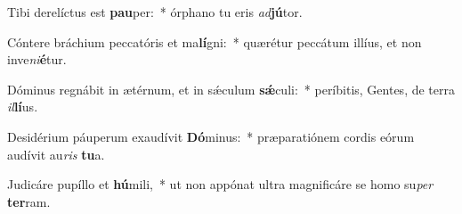 \item Tibi derelíctus est \textbf{pau}per:~* órphano tu eris \textit{ad}\textbf{jú}tor.
\item Cóntere bráchium peccatóris et ma\textbf{lí}gni:~* quærétur peccátum illíus, et non inve\textit{ni}\textbf{é}tur.
\item Dóminus regnábit in ætérnum, et in sǽculum \textbf{sǽ}culi:~* períbitis, Gentes, de terra \textit{il}\textbf{lí}us.
\item Desidérium páuperum exaudívit \textbf{Dó}minus:~* præparatiónem cordis eórum audívit au\textit{ris} \textbf{tu}a.
\item Judicáre pupíllo et \textbf{hú}mili,~* ut non appónat ultra magnificáre se homo su\textit{per} \textbf{ter}ram.
